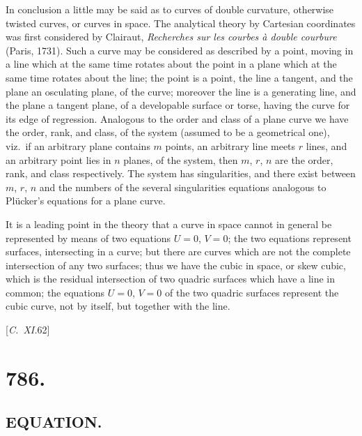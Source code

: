 \documentclass[12pt,a4paper,oneside]{book}
\newcommand{\paperref}[1]{\par\noindent\hfill[#1]\hfill\null\par}
\begin{document}
In conclusion a little may be said as to curves of double curvature, otherwise twisted curves, or curves in space. The analytical theory by Cartesian coordinates was first considered by Clairaut, \textit{Recherches sur les courbes \`a double courbure} (Paris, 1731). Such a curve may be considered as described by a point, moving in a line which at the same time rotates about the point in a plane which at the same time rotates about the line; the point is a point, the line a tangent, and the plane an osculating plane, of the curve; moreover the line is a generating line, and the plane a tangent plane, of a developable surface or torse, having the curve for its edge of regression. Analogous to the order and class of a plane curve we have the order, rank, and class, of the system (assumed to be a geometrical one), viz.\ if an arbitrary plane contains $m$ points, an arbitrary line meets $r$ lines, and an arbitrary point lies in $n$ planes, of the system, then $m$, $r$, $n$ are the order, rank, and class respectively. The system has singularities, and there exist between $m$, $r$, $n$ and the numbers of the several singularities equations analogous to Pl\"ucker's equations for a plane curve.

It is a leading point in the theory that a curve in space cannot in general be represented by means of two equations $U=0$, $V=0$; the two equations represent surfaces, intersecting in a curve; but there are curves which are not the complete intersection of any two surfaces; thus we have the cubic in space, or skew cubic, which is the residual intersection of two quadric surfaces which have a line in common; the equations $U=0$, $V=0$ of the two quadric surfaces represent the cubic curve, not by itself, but together with the line.

\paperref{\textit{C.~XI.}\hfill 62}


\vspace{2em}
\noindent\dotfill
\vspace{1em}

\section*{786.}
\subsection*{EQUATION.}
\end{document}
